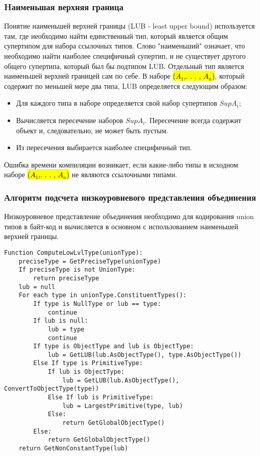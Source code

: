 \subsubsection{Hаименьшая верхняя граница}

Понятие наименьшей верхней границы (LUB - least upper bound) используется там, где необходимо найти единственный тип,
который является общим супертипом для набора ссылочных типов.
Слово "наименьший" означает, что необходимо найти наиболее специфичный супертип, и не существует другого общего
супертипа, который был бы подтипом LUB\@.
Отдельный тип является наименьшей верхней границей сам по себе.
В наборе \hl{($A_1$,. . . , $A_n$)}, который содержит по меньшей мере два типа, LUB определяется следующим образом:

\begin{itemize}[left=2em]
    \item Для каждого типа в наборе определяется свой набор супертипов $SupA_i$;
    \item Вычисляется пересечение наборов $SupA_i$.
    Пересечение всегда содержит объект и, следовательно, не может быть пустым.
    \item Из пересечения выбирается наиболее специфичный тип.
\end{itemize}

Ошибка времени компиляции возникает, если какие-либо типы в исходном наборе \hl{($A_1$,. . . , $A_n$)}
не являются ссылочными типами.

\subsubsection{Алгоритм подсчета низкоуровневого представления объединения}

Низкоуровневое представление объединения необходимо для кодирования union типов в байт-код и вычисляется в основном
с использованием наименьшей верхней границы.

\begin{lstlisting}[label={lst:computelub}]
Function ComputeLowLvlType(unionType):
    preciseType = GetPreciseType(unionType)
    If preciseType is not UnionType:
        return preciseType
    lub = null
    For each type in unionType.ConstituentTypes():
        If type is NullType or lub == type:
            continue
        If lub is null:
            lub = type
            continue
        If type is ObjectType and lub is ObjectType:
            lub = GetLUB(lub.AsObjectType(), type.AsObjectType())
        Else If type is PrimitiveType:
            If lub is ObjectType:
                lub = GetLUB(lub.AsObjectType(), ConvertToObjectType(type))
            Else If lub is PrimitiveType:
                lub = LargestPrimitive(type, lub)
            Else:
                return GetGlobalObjectType()
        Else:
            return GetGlobalObjectType()
    return GetNonConstantType(lub)
\end{lstlisting}

